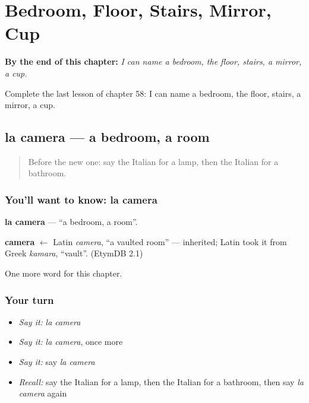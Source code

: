 
\chapter{Bedroom, Floor, Stairs, Mirror, Cup}
\label{ch:it-bedroom-floor-stairs-mirror-cup}

\begin{chapteropening}
\textbf{By the end of this chapter:} \emph{I can name a bedroom, the floor, stairs, a mirror, a cup.}

Complete the last lesson of chapter 58: I can name a bedroom, the floor, stairs, a mirror, a cup.
\end{chapteropening}

\section[la camera]{la camera — a bedroom, a room}

\label{lesson:IT-C58-camera}



\begin{quote}
Before the new one: say the Italian for a lamp, then the Italian for a bathroom.
\end{quote}

\subsection*{You'll want to know: la camera}
\textbf{la camera} — \textquotedblleft{}a bedroom, a room\textquotedblright{}.

\begin{cousinweb}
\textbf{camera} $\leftarrow$ Latin \emph{camera}, \textquotedblleft{}a vaulted room\textquotedblright{} — inherited; Latin took it from Greek \emph{kamara}, \textquotedblleft{}vault\textquotedblright{}. (EtymDB 2.1)
\end{cousinweb}

\begin{grammarlens}[title={What you've built}]
One more word for this chapter.
\end{grammarlens}

\subsection*{Your turn}
\begin{itemize}
\raggedright
  \item \emph{Say it:} \emph{la camera}
  \item \emph{Say it:} \emph{la camera}, once more
  \item \emph{Say it:} say \emph{la camera}
  \item \emph{Recall:} say the Italian for a lamp, then the Italian for a bathroom, then say \emph{la camera} again
\end{itemize}

